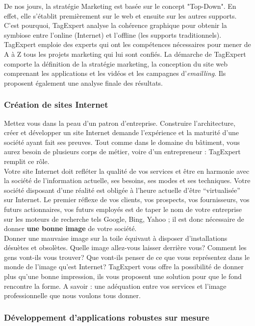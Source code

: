 \documentclass{article}
\begin{document}
\begin{sffamily}
De nos jours, la stratégie Marketing est basée sur le concept "Top-Down". En effet, elle s'établit premièrement sur le web et ensuite sur les autres supports. C'est 
pourquoi, TagExpert analyse la cohérence graphique pour obtenir la symbiose entre l'online (Internet) et l'offline (les supports traditionnels). TagExpert emploie des 
experts qui ont les compétences nécessaires pour mener de A à Z tous les projets marketing qui lui sont confiés. La démarche de TagExpert comporte la définition de la 
stratégie marketing, la conception du site web comprenant les applications et les vidéos et les campagnes d'\textit{emailling}. Ils proposent également une analyse finale 
des résultats.

\subsubsection{Création de sites Internet}

Mettez vous dans la peau d'un patron d'entreprise. Construire l'architecture, créer et développer un site Internet demande l'expérience et la maturité d'une société ayant 
fait ses preuves. Tout comme dans le domaine du bâtiment, vous aurez besoin de plusieurs corps de métier, voire d'un entrepreneur : TagExpert remplit ce rôle. \\

Votre site Internet doit refléter la qualité de vos services et être en harmonie avec la société de l'information actuelle, ses besoins, ses modes et ses techniques.
Votre société disposant d'une réalité est obligée à l'heure actuelle d'être ``virtualisée'' sur Internet. Le premier réflexe de vos clients, vos prospects, vos fournisseurs, 
vos futurs actionnaires, vos futurs employés est de taper le nom de votre entreprise sur les moteurs de recherche tels Google, Bing, Yahoo ; il est donc nécessaire de donner 
\textbf{une bonne image} de votre société. \\

Donner une mauvaise image sur la toile équivaut à disposer d'installations désuètes et obsolètes. Quelle image allez-vous laisser derrière vous? Comment les gens vont-ils 
vous trouver? Que vont-ils penser de ce que vous représentez dans le monde de l'image qu'est Internet? TagExpert vous offre la possibilité de donner plus qu'une bonne 
impression, ils vous proposent une solution pour que le fond rencontre la forme. A savoir : une adéquation entre vos services et l'image professionnelle que nous voulons 
tous donner.

\subsubsection{Développement d'applications robustes sur mesure}


\end{sffamily}
\end{document}

